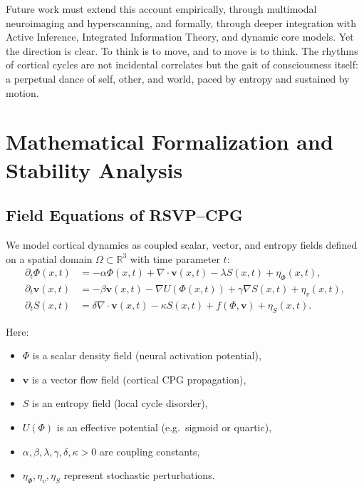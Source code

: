 \documentclass{article}
\begin{document}
Future work must extend this account empirically, through multimodal neuroimaging and hyperscanning, and formally, through deeper integration with Active Inference, Integrated Information Theory, and dynamic core models. Yet the direction is clear. To think is to move, and to move is to think. The rhythms of cortical cycles are not incidental correlates but the gait of consciousness itself: a perpetual dance of self, other, and world, paced by entropy and sustained by motion.

\newpage
\appendix
\section{Mathematical Formalization and Stability Analysis}
\label{app:math}

\subsection{Field Equations of RSVP--CPG}

We model cortical dynamics as coupled scalar, vector, and entropy fields defined on a spatial domain 
$\Omega \subset \mathbb{R}^3$ with time parameter $t$:
\begin{align}
\partial_t \Phi(x,t) &= -\alpha \Phi(x,t) + \nabla \cdot \mathbf{v}(x,t) - \lambda S(x,t) + \eta_\Phi(x,t), \label{eq:phi}\\
\partial_t \mathbf{v}(x,t) &= -\beta \mathbf{v}(x,t) - \nabla U(\Phi(x,t)) + \gamma \nabla S(x,t) + \eta_v(x,t), \label{eq:v}\\
\partial_t S(x,t) &= \delta \nabla \cdot \mathbf{v}(x,t) - \kappa S(x,t) + f(\Phi,\mathbf{v}) + \eta_S(x,t). \label{eq:S}
\end{align}

Here:
\begin{itemize}
\item $\Phi$ is a scalar density field (neural activation potential),
\item $\mathbf{v}$ is a vector flow field (cortical CPG propagation),
\item $S$ is an entropy field (local cycle disorder),
\item $U(\Phi)$ is an effective potential (e.g.\ sigmoid or quartic),
\item $\alpha,\beta,\lambda,\gamma,\delta,\kappa >0$ are coupling constants,
\item $\eta_\Phi, \eta_v, \eta_S$ represent stochastic perturbations.
\end{itemize}
\end{document}
